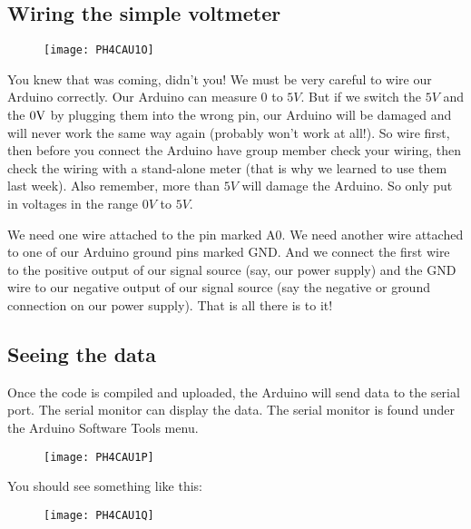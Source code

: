 \subsection{Wiring the simple voltmeter}

\begin{figure}[h!]
\texttt{[image: PH4CAU1O]}
\end{figure}You knew that was coming, didn't
you! We must be very careful to wire our Arduino correctly. Our Arduino can
measure $0$ to $5\unit{V}.$ But if we switch the $5\unit{V}$ and the $0\unit{%
V}$ by plugging them into the wrong pin, our Arduino will be damaged and
will never work the same way again (probably won't work at all!). So wire
first, then before you connect the Arduino have group member check your
wiring, then check the wiring with a stand-alone meter (that is why we
learned to use them last week). Also remember, more than $5\unit{V}$ will
damage the Arduino. So only put in voltages in the range $0\unit{V}$ to $5%
\unit{V}.$

We need one wire attached to the pin marked A0. We need another wire
attached to one of our Arduino ground pins marked GND. And we connect the
first wire to the positive output of our signal source (say, our power
supply) and the GND wire to our negative output of our signal source (say
the negative or ground connection on our power supply). That is all there is
to it!

\subsection{Seeing the data}

Once the code is compiled and uploaded, the Arduino will send data to the
serial port. The serial monitor can display the data. The serial monitor is
found under the Arduino Software Tools menu.

\begin{figure}[h!]
\texttt{[image: PH4CAU1P]}
\end{figure}You should see something like
this:

\begin{figure}[h!]
\texttt{[image: PH4CAU1Q]}
\end{figure}

